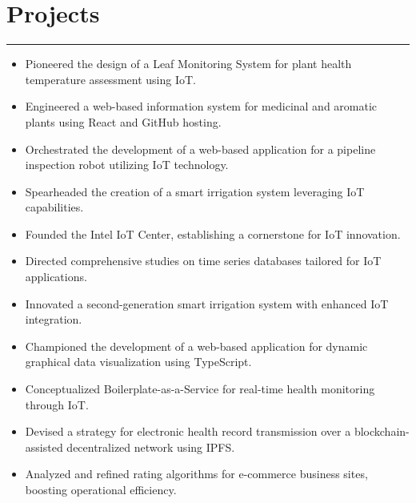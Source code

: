 \documentclass[10pt, a4paper]{article}
\begin{document}
    \section*{Projects}
    \vspace*{-2.5mm}
    \hrule 
    \vspace*{2mm}
    \begin{itemize}[leftmargin=*]
                	\vspace*{1mm}
  \item Pioneered the design of a Leaf Monitoring System for plant health temperature assessment using IoT.
\vspace*{-6mm}
\item Engineered a web-based information system for medicinal and aromatic plants using React and GitHub hosting.
\vspace*{-2mm}
\item Orchestrated the development of a web-based application for a pipeline inspection robot utilizing IoT technology.
\vspace*{-2mm}
\item Spearheaded the creation of a smart irrigation system leveraging IoT capabilities.
\vspace*{-2mm}
\item Founded the Intel IoT Center, establishing a cornerstone for IoT innovation.
\vspace*{-2mm}
\item Directed comprehensive studies on time series databases tailored for IoT applications.
\vspace*{-2mm}
\item Innovated a second-generation smart irrigation system with enhanced IoT integration.
\vspace*{-2mm}
\item Championed the development of a web-based application for dynamic graphical data visualization using TypeScript.
\vspace*{-2mm}
\item Conceptualized Boilerplate-as-a-Service for real-time health monitoring through IoT.
\vspace*{-2mm}
\item Devised a strategy for electronic health record transmission over a blockchain-assisted decentralized network using IPFS.
\vspace*{-2mm}
\item Analyzed and refined rating algorithms for e-commerce business sites, boosting operational efficiency.
\vspace*{-6mm}

\end{itemize}
\end{document}
